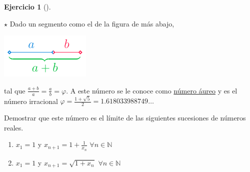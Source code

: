 \documentclass[
  a4paper,
]{scrreport}
\providecommand{\tightlist}{%
  \setlength{\itemsep}{0pt}\setlength{\parskip}{0pt}}\usepackage{longtable,booktabs,array}
\theoremstyle{definition}
\newtheorem{exercise}{Ejercicio}[chapter]
\theoremstyle{remark}
\begin{document}
\begin{exercise}[]\protect\hypertarget{exr-numero-aureo}{}\label{exr-numero-aureo}

\(\star\) Dado un segmento como el de la figura de más abajo,

\includegraphics{./img/sucesiones/numero-aureo.png}

tal que \(\frac{a+b}{a}=\frac{a}{b}=\varphi\). A este número se le
conoce como
\href{https://es.wikipedia.org/wiki/N\%C3\%BAmero_\%C3\%A1ureo}{número
áureo} y es el número irracional
\(\varphi=\frac{1+\sqrt{5}}{2}=1.618033988749\ldots\)

Demostrar que este número es el límite de las siguientes sucesiones de
números reales.

\begin{enumerate}
\def\labelenumi{\alph{enumi}.}
\tightlist
\item
  \(x_1=1\) y \(x_{n+1}=1+\frac{1}{x_n}\) \(\forall n\in \mathbb{N}\)
\item
  \(x_1=1\) y \(x_{n+1}=\sqrt{1+x_n}\) \(\forall n\in\mathbb{N}\)
\end{enumerate}

\end{exercise}
\end{document}
